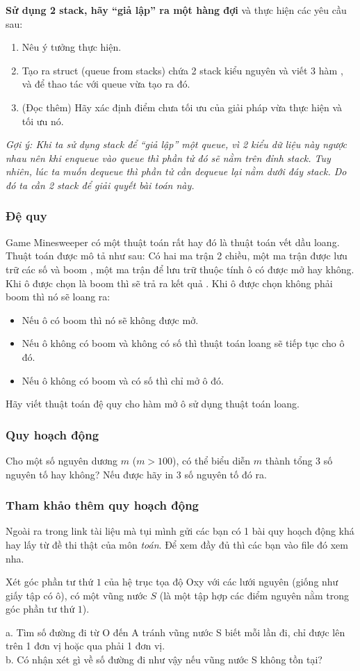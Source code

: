 \documentclass[main.tex]{subfiles}
\begin{document}
\textbf{Sử dụng 2 stack, hãy ``giả lập'' ra một hàng đợi} và thực hiện các yêu cầu sau:
\begin{enumerate}[label=\alph*.]
    \item Nêu ý tưởng thực hiện.
    \item Tạo ra struct  (queue from stacks) chứa 2 stack kiểu nguyên và viết 3 hàm ,  và   để thao tác với queue vừa tạo ra đó.
    \item (Đọc thêm) Hãy xác định điểm chưa tối ưu của giải pháp vừa thực hiện và tối ưu nó.
\end{enumerate}
\textit{Gợi ý: Khi ta sử dụng stack để ``giả lập'' một queue, vì 2 kiểu dữ liệu này ngược nhau nên khi enqueue vào queue thì phần tử đó sẽ nằm trên đỉnh stack. Tuy nhiên, lúc ta muốn dequeue thì phần tử cần dequeue lại nằm dưới đáy stack. Do đó ta cần 2 stack để giải quyết bài toán này.}

\subsubsection{Đệ quy}
Game Minesweeper có một thuật toán rất hay đó là thuật toán vết dầu loang. Thuật toán được mô tả như sau:
Có hai ma trận 2 chiều, một ma trận  được lưu trữ các số và boom , một ma trận  để lưu trữ thuộc tính ô có được mở hay không.
Khi ô được chọn là boom thì sẽ trả ra kết quả .   
Khi ô được chọn không phải boom thì nó sẽ loang ra:  
\begin{itemize}
    \item Nếu ô có boom thì nó sẽ không được mở.
    \item Nếu ô không có boom và không có số thì thuật   toán loang sẽ tiếp tục cho ô đó.
    \item Nếu ô không có boom và có số thì chỉ mở ô đó.
\end{itemize}
Hãy viết thuật toán đệ quy cho hàm mở ô sử dụng thuật toán loang.

\subsubsection{Quy hoạch động}
Cho một số nguyên dương $m$ ($m>100$), có thể biểu diễn $m$ thành tổng 3 số nguyên tố hay không? Nếu được hãy in 3 số nguyên tố đó ra. 

\subsubsection{Tham khảo thêm quy hoạch động}
Ngoài ra trong link tài liệu mà tụi mình gửi các bạn có 1 bài quy hoạch động khá hay lấy từ đề thi thật của môn \textit{toán}. Để xem đầy đủ thì các bạn vào file đó xem nha.\bigskip 

Xét góc phần tư thứ $1$ của hệ trục tọa độ Oxy với các lưới nguyên (giống như giấy tập có ô), có một vũng nước $S$ (là một tập hợp các điểm nguyên nằm trong góc phần tư thứ $1$). \bigskip

a. Tìm số đường đi từ O đến A tránh vũng nước S biết mỗi
lần đi, chỉ được lên trên 1 đơn vị hoặc qua phải 1 đơn vị.\\
b. Có nhận xét gì về số đường đi như vậy nếu vũng nước S
không tồn tại? \bigskip
\end{document}
